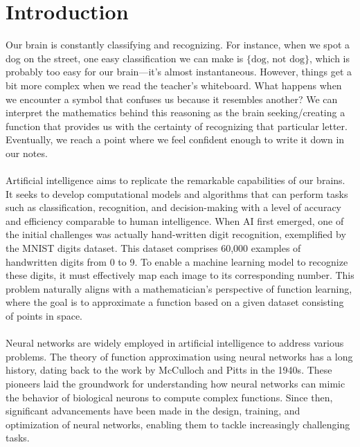 \documentclass[../main.tex]{subfiles}
\begin{document}
    \chapter{Introduction} \label{ch:intro}
    


\noindent Our brain is constantly classifying and recognizing. For instance, when we spot a dog on the street, one easy classification we can make is  $\{ \text{dog, not dog} \}$, which is probably too easy for our brain—it's almost instantaneous.  However, things get a bit more complex when we read the teacher's whiteboard. What happens when we encounter a symbol that confuses us because it resembles another?
We can interpret the mathematics behind this reasoning as the brain seeking/creating a function that provides us with the certainty of recognizing that particular letter. Eventually, we reach a point where we feel confident enough to write it down in our notes. \\ \\
Artificial intelligence aims to replicate the remarkable capabilities of our brains. It seeks to develop computational models and algorithms that can perform tasks such as classification, recognition, and decision-making with a level of accuracy and efficiency comparable to human intelligence. When AI first emerged, one of the initial challenges was actually hand-written digit recognition, exemplified by the MNIST digits dataset. This dataset comprises 60,000 examples of handwritten digits from 0 to 9. To enable a machine learning model to recognize these digits, it must effectively map each image to its corresponding number.
This problem naturally aligns with a mathematician's perspective of function learning, where the goal is to approximate a function based on a given dataset consisting of points in space.
\\ \\ 
Neural networks are widely employed in artificial intelligence to address various problems. The theory of function approximation using neural networks has a long history, dating back to the work by McCulloch and Pitts in the 1940s. These pioneers laid the groundwork for understanding how neural networks can mimic the behavior of biological neurons to compute complex functions. Since then, significant advancements have been made in the design, training, and optimization of neural networks, enabling them to tackle increasingly challenging tasks.
\end{document}
